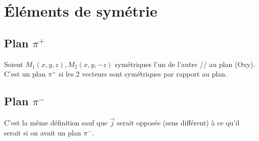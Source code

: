 \documentclass[french]{yLectureNote}
\renewcommand{\vec}{\overrightarrow}
\newcommand{\dd}{\mathrm{d}}
\newcommand{\pip}{\pi^+}
\newcommand{\pim}{\pi^-}
\begin{document}
%
\section{Éléments de symétrie}
\subsection{Plan \(\pip\)}
Soient \(M_1(x,y,z), M_2(x,y,-z)\) symétriques l'un de l'autre // au plan (Oxy). C'est un plan \(\pip\) si les 2 vecteurs sont symétriques par rapport au plan.
\subsection{Plan \(\pim\)}
C'est la m\^eme définition sauf que \(\vec{j}\) serait opposée (sens différent) à ce qu'il serait si on avait un plan \(\pim\).

\end{document}
